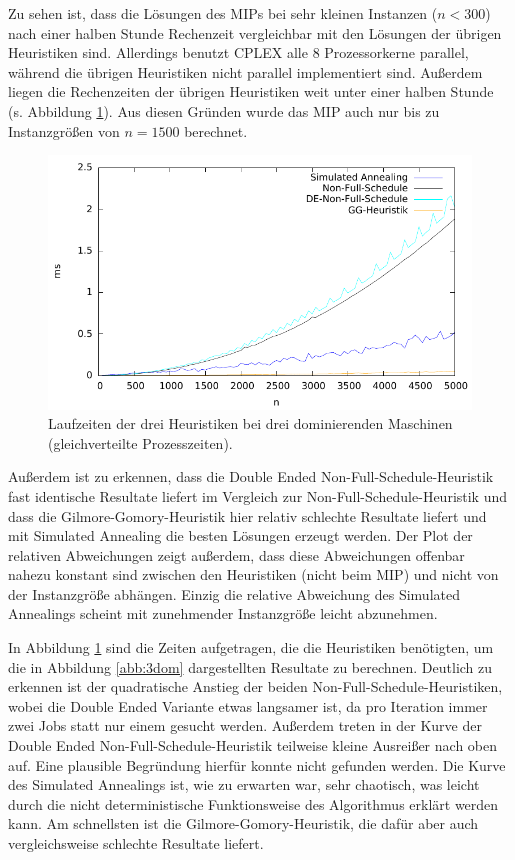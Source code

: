 \documentclass{scrreprt}
\begin{document}
Zu sehen ist, dass die Lösungen des MIPs bei sehr kleinen Instanzen ($n<300$) nach einer halben Stunde Rechenzeit vergleichbar mit den Lösungen der übrigen Heuristiken sind.
Allerdings benutzt CPLEX alle 8 Prozessorkerne parallel, während die übrigen Heuristiken nicht parallel implementiert sind.
Außerdem liegen die Rechenzeiten der übrigen Heuristiken weit unter einer halben Stunde (s. Abbildung \ref{abb:3domtime}).
Aus diesen Gründen wurde das MIP auch nur bis zu Instanzgrößen von $n=1500$ berechnet.
\begin{figure}
    \begin{center}
        \includegraphics[width=.8\textwidth]{../instances/3dom/plottime.pdf}
    \end{center}
    \caption{
        \label{abb:3domtime}
        Laufzeiten der drei Heuristiken bei drei dominierenden Maschinen (gleichverteilte Prozesszeiten).
    }
\end{figure}

Außerdem ist zu erkennen, dass die Double Ended Non-Full-Schedule-Heuristik fast identische Resultate liefert im Vergleich zur Non-Full-Schedule-Heuristik
und dass die Gilmore-Gomory-Heuristik hier relativ schlechte Resultate liefert und mit Simulated Annealing die besten Lösungen erzeugt werden.
Der Plot der relativen Abweichungen zeigt außerdem, dass diese Abweichungen offenbar nahezu konstant sind zwischen den Heuristiken (nicht beim MIP) 
und nicht von der Instanzgröße abhängen.
Einzig die relative Abweichung des Simulated Annealings scheint mit zunehmender Instanzgröße leicht abzunehmen.

In Abbildung \ref{abb:3domtime} sind die Zeiten aufgetragen, die die Heuristiken benötigten, um die in Abbildung \ref{abb:3dom} dargestellten Resultate zu berechnen.
Deutlich zu erkennen ist der quadratische Anstieg der beiden Non-Full-Schedule-Heuristiken, wobei die Double Ended Variante etwas langsamer ist,
da pro Iteration immer zwei Jobs statt nur einem gesucht werden.
Außerdem treten in der Kurve der Double Ended Non-Full-Schedule-Heuristik teilweise kleine Ausreißer nach oben auf.
Eine plausible Begründung hierfür konnte nicht gefunden werden.
Die Kurve des Simulated Annealings ist, wie zu erwarten war, sehr chaotisch, was leicht durch die nicht deterministische Funktionsweise des Algorithmus erklärt werden kann.
Am schnellsten ist die Gilmore-Gomory-Heuristik, die dafür aber auch vergleichsweise schlechte Resultate liefert.
\end{document}
